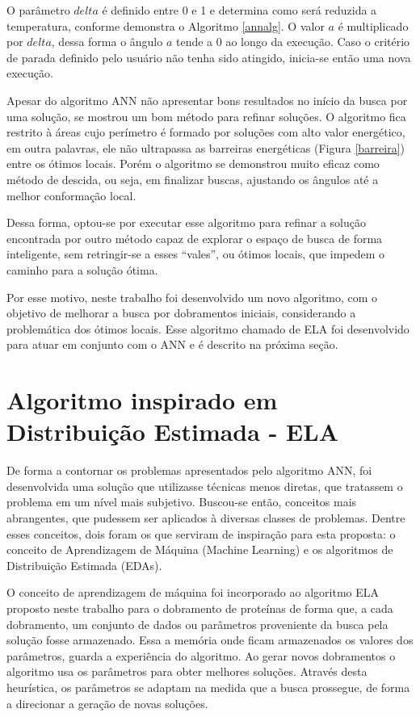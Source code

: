 \documentclass[dm,ppgcomp]{texfurg}
\begin{document}
O parâmetro $delta$ é definido entre 0 e 1 e determina como será reduzida a temperatura, conforme demonstra o Algoritmo \ref{annalg}. O valor $a$ é multiplicado por $delta$, dessa forma o ângulo $a$ tende a 0 ao longo da execução. Caso o critério de parada definido pelo usuário não tenha sido atingido, inicia-se então uma nova execução.

Apesar do algoritmo ANN não apresentar bons resultados no início da busca por uma solução, se mostrou um bom método para refinar soluções. O algoritmo fica restrito à áreas cujo perímetro é formado por soluções com alto valor energético, em outra palavras, ele não ultrapassa as barreiras energéticas (Figura \ref{barreira}) entre os ótimos locais. Porém o algoritmo se demonstrou muito eficaz como método de descida, ou seja, em finalizar buscas, ajustando os ângulos até a melhor conformação local.

Dessa forma, optou-se por executar esse algoritmo para refinar a solução encontrada por outro método capaz de explorar o espaço de busca de forma inteligente, sem retringir-se a esses “vales”, ou ótimos locais, que impedem o caminho para a solução ótima. 

Por esse motivo, neste trabalho foi desenvolvido um novo algoritmo, com o objetivo de melhorar a busca por dobramentos iniciais, considerando a problemática dos ótimos locais. Esse algoritmo chamado de ELA foi desenvolvido para atuar em conjunto com o ANN e é descrito na próxima seção. 

\section{Algoritmo inspirado em Distribuição Estimada - ELA}

De forma a contornar os problemas apresentados pelo algoritmo ANN, foi desenvolvida uma solução que utilizasse técnicas menos diretas, que tratassem o problema em um nível mais subjetivo. Buscou-se então, conceitos mais abrangentes, que pudessem ser aplicados à diversas classes de problemas. Dentre esses conceitos, dois foram os que serviram de inspiração para esta proposta: o conceito de  Aprendizagem de Máquina (Machine Learning) e os algoritmos de Distribuição Estimada (EDAs).

O conceito de aprendizagem de máquina foi incorporado ao algoritmo ELA proposto neste trabalho para o dobramento de proteínas de forma que, a cada dobramento, um conjunto de dados ou parâmetros proveniente da busca pela solução fosse armazenado. Essa a memória onde ficam armazenados os valores dos parâmetros, guarda a experiência do algoritmo. Ao gerar novos dobramentos o algoritmo usa os parâmetros para obter melhores soluções. Através desta heurística, os parâmetros se adaptam na medida que a busca prossegue, de forma a direcionar a geração de novas soluções. 
\end{document}
